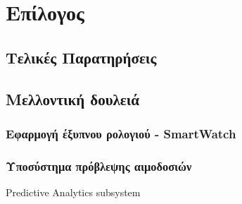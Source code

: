 \chapter{Επίλογος}\label{ch:conclusion}

\section{Τελικές Παρατηρήσεις}

\section{Μελλοντική δουλειά}
	\subsection{Εφαρμογή έξυπνου ρολογιού - SmartWatch}
	\subsection{Υποσύστημα πρόβλεψης αιμοδοσιών}
		Predictive Analytics subsystem
